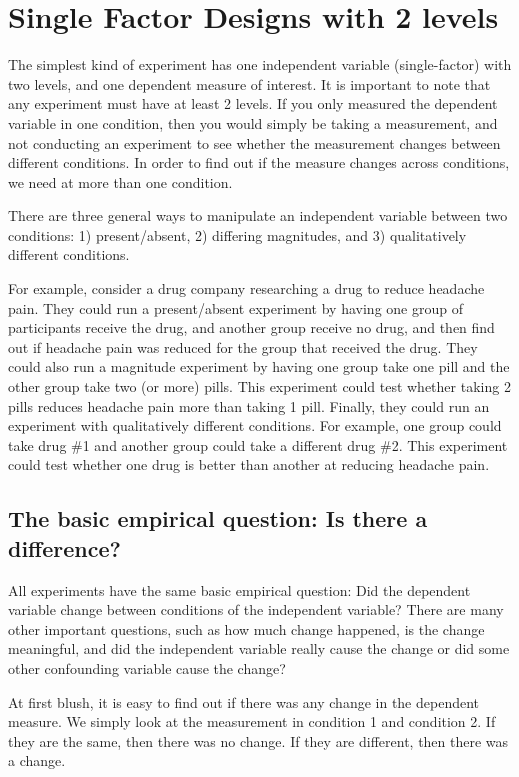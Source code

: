 \section{Single Factor Designs with 2 levels}

The simplest kind of experiment has one independent variable (single-factor) with two levels, and one dependent measure of interest. It is important to note that any experiment must have at least 2 levels. If you only measured the dependent variable in one condition, then you would simply be taking a measurement, and not conducting an experiment to see whether the measurement changes between different conditions. In order to find out if the measure changes across conditions, we need at more than one condition.

There are three general ways to manipulate an independent variable between two conditions: 1) present/absent, 2) differing magnitudes, and 3) qualitatively different conditions.

For example, consider a drug company researching a drug to reduce headache pain. They could run a present/absent experiment by having one group of participants receive the drug, and another group receive no drug, and then find out if headache pain was reduced for the group that received the drug. They could also run a magnitude experiment by having one group take one pill and the other group take two (or more) pills. This experiment could test whether taking 2 pills reduces headache pain more than taking 1 pill. Finally, they could run an experiment with qualitatively different conditions. For example, one group could take drug \#1 and another group could take a different drug \#2. This experiment could test whether one drug is better than another at reducing headache pain.

\subsection{The basic empirical question: Is there a difference?}

All experiments have the same basic empirical question: Did the dependent variable change between conditions of the independent variable? There are many other important questions, such as how much change happened, is the change meaningful, and did the independent variable really cause the change or did some other confounding variable cause the change? 

At first blush, it is easy to find out if there was any change in the dependent measure. We simply look at the measurement in condition 1 and condition 2. If they are the same, then there was no change. If they are different, then there was a change. 

